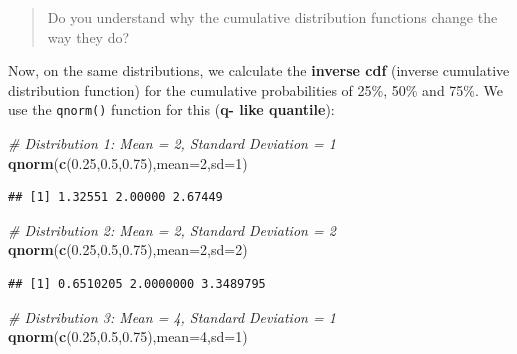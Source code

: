 \documentclass[
]{book}
\newenvironment{Shaded}{\begin{snugshade}}{\end{snugshade}}
\newcommand{\AttributeTok}[1]{\textcolor[rgb]{0.13,0.29,0.53}{#1}}
\newcommand{\CommentTok}[1]{\textcolor[rgb]{0.56,0.35,0.01}{\textit{#1}}}
\newcommand{\DecValTok}[1]{\textcolor[rgb]{0.00,0.00,0.81}{#1}}
\newcommand{\FloatTok}[1]{\textcolor[rgb]{0.00,0.00,0.81}{#1}}
\newcommand{\FunctionTok}[1]{\textcolor[rgb]{0.13,0.29,0.53}{\textbf{#1}}}
\newcommand{\NormalTok}[1]{#1}
\begin{document}
\begin{quote}
Do you understand why the cumulative distribution functions change the way they do?
\end{quote}

Now, on the same distributions, we calculate the \textbf{inverse cdf} (inverse cumulative distribution function) for the cumulative probabilities of 25\%, 50\% and 75\%. We use the \texttt{qnorm()} function for this (\textbf{q- like quantile}):

\begin{Shaded}
\begin{Highlighting}[]
\CommentTok{\# Distribution 1: Mean = 2, Standard Deviation = 1}
\FunctionTok{qnorm}\NormalTok{(}\FunctionTok{c}\NormalTok{(}\FloatTok{0.25}\NormalTok{,}\FloatTok{0.5}\NormalTok{,}\FloatTok{0.75}\NormalTok{),}\AttributeTok{mean=}\DecValTok{2}\NormalTok{,}\AttributeTok{sd=}\DecValTok{1}\NormalTok{)}
\end{Highlighting}
\end{Shaded}

\begin{verbatim}
## [1] 1.32551 2.00000 2.67449
\end{verbatim}

\begin{Shaded}
\begin{Highlighting}[]
\CommentTok{\# Distribution 2: Mean = 2, Standard Deviation = 2}
\FunctionTok{qnorm}\NormalTok{(}\FunctionTok{c}\NormalTok{(}\FloatTok{0.25}\NormalTok{,}\FloatTok{0.5}\NormalTok{,}\FloatTok{0.75}\NormalTok{),}\AttributeTok{mean=}\DecValTok{2}\NormalTok{,}\AttributeTok{sd=}\DecValTok{2}\NormalTok{)}
\end{Highlighting}
\end{Shaded}

\begin{verbatim}
## [1] 0.6510205 2.0000000 3.3489795
\end{verbatim}

\begin{Shaded}
\begin{Highlighting}[]
\CommentTok{\# Distribution 3: Mean = 4, Standard Deviation = 1}
\FunctionTok{qnorm}\NormalTok{(}\FunctionTok{c}\NormalTok{(}\FloatTok{0.25}\NormalTok{,}\FloatTok{0.5}\NormalTok{,}\FloatTok{0.75}\NormalTok{),}\AttributeTok{mean=}\DecValTok{4}\NormalTok{,}\AttributeTok{sd=}\DecValTok{1}\NormalTok{)}
\end{Highlighting}
\end{Shaded}
\end{document}
